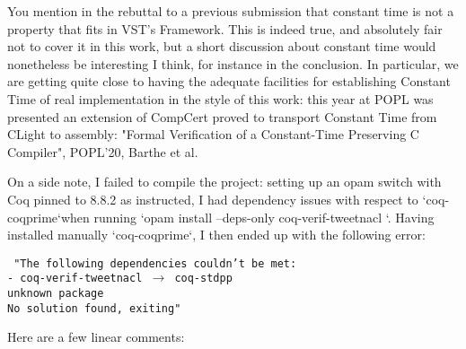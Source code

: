 You mention in the rebuttal to a previous submission that constant time is not a property that fits in VST's Framework. This is indeed true, and absolutely fair not to cover it in this work, but a short discussion about constant time would nonetheless be interesting I think, for instance in the conclusion. In particular, we are getting quite close to having the adequate facilities for establishing Constant Time of real implementation in the style of this work: this year at POPL was presented an extension of CompCert proved to transport Constant Time from CLight to assembly:
"Formal Verification of a Constant-Time Preserving C Compiler", POPL'20, Barthe et al.

On a side note, I failed to compile the project: setting up an opam switch with Coq pinned to 8.8.2 as instructed, I had dependency issues with respect to `coq-coqprime`when running `opam install --deps-only coq-verif-tweetnacl `. Having installed manually `coq-coqprime`, I then ended up with the following error:

{\footnotesize\texttt{
    "The following dependencies couldn't be met:\\
    - coq-verif-tweetnacl $\rightarrow$ coq-stdpp \\
    unknown package\\
    No solution found, exiting"}}

Here are a few linear comments:

